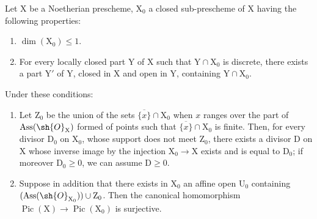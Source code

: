 \begin{proposition}[21.9.11]
\label{IV.21.9.11}
Let $\mathrm{X}$ be a Noetherian prescheme, $\mathrm{X}_0$ a closed sub-prescheme of $\mathrm{X}$ having the following properties:
\begin{enumerate}
  \item[\rm 1\textsuperscript{o}] $\dim(\mathrm{X}_0)\leq 1$.
  \item[\rm 2\textsuperscript{o}] For every locally closed part $\mathrm{Y}$ of $\mathrm{X}$ such that $\mathrm{Y}\cap\mathrm{X}_0$ is discrete, there exists a part $\mathrm{Y}'$ of $\mathrm{Y}$, closed in $\mathrm{X}$ and open in $\mathrm{Y}$, containing $\mathrm{Y}\cap\mathrm{X}_0$.
\end{enumerate}
Under these conditions:
\begin{enumerate}[label=(\roman*)]
  \item Let $\mathrm{Z}_0$ be the union of the sets $\overline{\{x\}}\cap\mathrm{X}_0$ when $x$ ranges over the part of $\operatorname{Ass}(\sh{O}_\mathrm{X})$ formed of points such that $\overline{\{x\}}\cap\mathrm{X}_0$ is finite.
Then, for every divisor $\mathrm{D}_0$ on $\mathrm{X}_0$, whose support does not meet $\mathrm{Z}_0$, there exists a divisor $\mathrm{D}$ on $\mathrm{X}$ whose inverse image by the injection $\mathrm{X}_0\to\mathrm{X}$ exists  and is equal to $\mathrm{D}_0$;
if moreover $\mathrm{D}_0\geq 0$, we can assume $\mathrm{D}\geq 0$.

  \item Suppose in addition that there exists in $\mathrm{X}_0$ an affine open $\mathrm{U}_0$ containing $(\operatorname{Ass}(\sh{O}_{\mathrm{X}_0}))\cup\mathrm{Z}_0$.
Then the canonical homomorphism  $\operatorname{Pic}(\mathrm{X})\to\operatorname{Pic}(\mathrm{X}_0)$ is surjective.
\end{enumerate}
\end{proposition}


